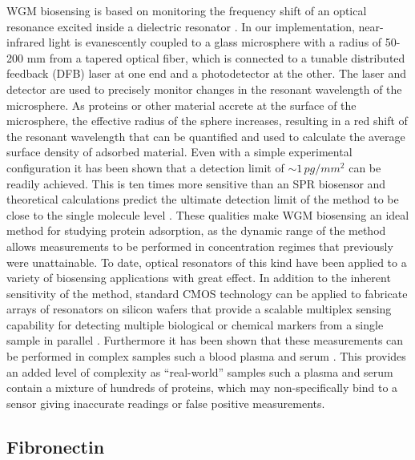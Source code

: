 WGM biosensing is based on monitoring the frequency shift of an optical
resonance excited inside a dielectric resonator \cite{Vollmer2005,Vollmer2002}.
In our implementation, near-infrared light is evanescently coupled
to a glass microsphere with a radius of 50-200 \textgreek{m}m from
a tapered optical fiber, which is connected to a tunable distributed
feedback (DFB) laser at one end and a photodetector at the other.
The laser and detector are used to precisely monitor changes in the
resonant wavelength of the microsphere. As proteins or other material
accrete at the surface of the microsphere, the effective radius of
the sphere increases, resulting in a red shift of the resonant wavelength
that can be quantified and used to calculate the average surface density
of adsorbed material. Even with a simple experimental configuration
\cite{Vollmer2002} it has been shown that a detection limit of $\sim1\, pg/mm^{2}$
can be readily achieved. This is ten times more sensitive than an
SPR biosensor and theoretical calculations predict the ultimate detection
limit of the method to be close to the single molecule level \cite{Armani2003,Vollmer2008,Vollmer2008a,Arnold2003}.
These qualities make WGM biosensing an ideal method for studying protein
adsorption, as the dynamic range of the method allows measurements
to be performed in concentration regimes that previously were unattainable.
To date, optical resonators of this kind have been applied to a variety
of biosensing applications with great effect. In addition to the inherent
sensitivity of the method, standard CMOS technology can be applied
to fabricate arrays of resonators on silicon wafers that provide a
scalable multiplex sensing capability for detecting multiple biological
or chemical markers from a single sample in parallel \cite{Luchansky2010,Washburn2009}.
Furthermore it has been shown that these measurements can be performed
in complex samples such a blood plasma and serum \cite{Luchansky2011}.
This provides an added level of complexity as {}``real-world'' samples
such a plasma and serum contain a mixture of hundreds of proteins,
which may non-specifically bind to a sensor giving inaccurate readings
or false positive measurements. 


\subsection{Fibronectin}

